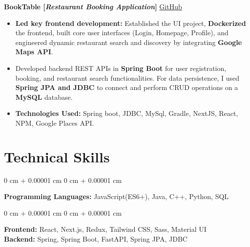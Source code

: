 \documentclass[10pt, letterpaper]{article}
\newenvironment{highlights}{
    \begin{itemize}[
        topsep=0.10 cm,     %
        parsep=0.10 cm,     %
        partopsep=0pt,      %
        itemsep=0pt,        %
        leftmargin=0 cm + 10pt  %
    ]
}{
    \end{itemize}
}
\newenvironment{onecolentry}{
    \begin{adjustwidth}{
        0 cm + 0.00001 cm
    }{
        0 cm + 0.00001 cm
    }
}{
    \end{adjustwidth}
}
\begin{document}
        \vspace{0.2 cm}

        \noindent
        \textbf{BookTable [\textit{Restaurant Booking Application}]} \hfill \href{https://github.com/gopinathsjsu/team-project-20201-synergy}{\small \faGithub \space GitHub}
        
        \begin{highlights}
            \item \textbf{Led key frontend development:} Established the UI project, \textbf{Dockerized} the frontend, built core user interfaces (Login, Homepage, Profile), and engineered dynamic restaurant search and discovery by integrating \textbf{Google Maps API}.
            \item Developed backend REST APIs in \textbf{Spring Boot} for user registration, booking, and restaurant search functionalities. For data persistence, I used \textbf{Spring JPA and JDBC} to connect and perform CRUD operations on a \textbf{MySQL} database.
            \item \textbf{Technologies Used:} Spring boot, JDBC, MySql, Gradle, NextJS, React, NPM, Google Places API.
        \end{highlights}



    
    \section{Technical Skills}

        \begin{onecolentry}
        \textbf{Programming Languages:} JavaScript(ES6+), Java, C++, Python, SQL  %
        \end{onecolentry}
        
        \vspace{0.1 cm}
        
        \begin{onecolentry}
        \textbf{Frontend:} React, Next.js, Redux, Tailwind CSS, Sass, Material UI \\  %
        \vspace{0.1 cm}
        \textbf{Backend:} Spring, Spring Boot, FastAPI, Spring JPA, JDBC  %
        \end{onecolentry}
        
\end{document}
